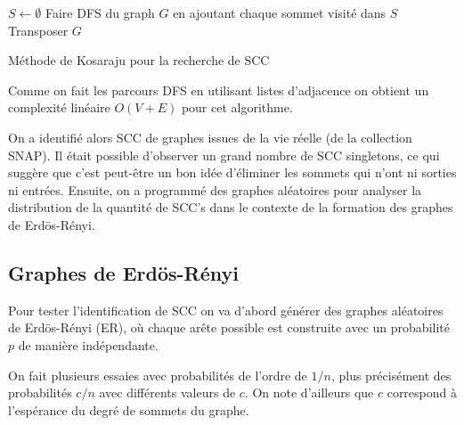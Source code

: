 \documentclass[a4paper,12pt,twoside]{article}
\begin{document}
\begin{algorithm}
 $S \longleftarrow \emptyset$\;
 Faire DFS du graph $G$ en ajoutant chaque sommet visité dans $S$\;
 Transposer $G$\;
 \caption{Méthode de Kosaraju pour la recherche de SCC}
 \label{algo}
\end{algorithm}

Comme on fait les parcours DFS en utilisant listes d'adjacence on obtient un complexité linéaire $O(V+E)$ pour cet algorithme.

On a identifié alors SCC de graphes issues de la vie réelle (de la collection SNAP). Il était possible d'observer un grand nombre de SCC singletons, ce qui suggère que c'est peut-être un bon idée d'éliminer les sommets qui n'ont ni sorties ni entrées. Ensuite, on a programmé des graphes aléatoires pour analyser la distribution de la quantité de SCC's dans le contexte de la formation des graphes de Erdös-Rényi.

\subsection{Graphes de Erdös-Rényi}
Pour tester l'identification de SCC on va d'abord générer des graphes aléatoires de Erdös-Rényi (ER), où chaque arête possible est construite avec un probabilité $p$ de manière indépendante.

On fait plusieurs essaies avec probabilités de l'ordre de $1/n$, plus précisément des probabilités $c/n$ avec différents valeurs de $c$. On note d'ailleurs que $c$ correspond à l'espérance du degré de sommets du graphe. 
\end{document}
